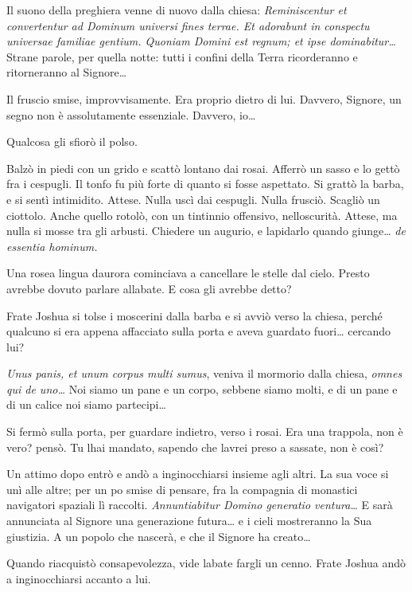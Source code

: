 Il suono della preghiera venne di nuovo dalla chiesa:
\emph{Reminiscentur et convertentur ad Dominum universi fines terrae. Et
	adorabunt in conspectu universae familiae gentium. Quoniam Domini est
	regnum; et ipse dominabitur\ldots{}} Strane parole, per quella notte:
tutti i confini della Terra ricorderanno e ritorneranno al
Signore\ldots{}

Il fruscio smise, improvvisamente. Era proprio dietro di lui. Davvero,
Signore, un segno non è assolutamente essenziale. Davvero, io\ldots{}

Qualcosa gli sfiorò il polso.

Balzò in piedi con un grido e scattò lontano dai rosai. Afferrò un sasso
e lo gettò fra i cespugli. Il tonfo fu più forte di quanto si fosse
aspettato. Si grattò la barba, e si sentì intimidito. Attese. Nulla uscì
dai cespugli. Nulla frusciò. Scagliò un ciottolo. Anche quello rotolò,
con un tintinnio offensivo, nell\textquotesingle oscurità. Attese, ma
nulla si mosse tra gli arbusti. Chiedere un augurio, e lapidarlo quando
giunge\ldots{} \emph{de essentia hominum.}

Una rosea lingua d\textquotesingle aurora cominciava a cancellare le
stelle dal cielo. Presto avrebbe dovuto parlare
all\textquotesingle abate. E cosa gli avrebbe detto?

Frate Joshua si tolse i moscerini dalla barba e si avviò verso la
chiesa, perché qualcuno si era appena affacciato sulla porta e aveva
guardato fuori\ldots{} cercando lui?

\emph{Unus panis, et unum corpus multi sumus}, veniva il mormorio dalla
chiesa, \emph{omnes qui de uno\ldots{}} Noi siamo un pane e un corpo,
sebbene siamo molti, e di un pane e di un calice noi siamo
partecipi\ldots{}

Si fermò sulla porta, per guardare indietro, verso i rosai. Era una
trappola, non è vero? pensò. Tu l\textquotesingle hai mandato, sapendo
che l\textquotesingle avrei preso a sassate, non è così?

Un attimo dopo entrò e andò a inginocchiarsi insieme agli altri. La sua
voce si unì alle altre; per un po\textquotesingle{} smise di pensare,
fra la compagnia di monastici navigatori spaziali lì raccolti.
\emph{Annuntiabitur Domino generatio ventura\ldots{}} E sarà annunciata
al Signore una generazione futura\ldots{} e i cieli mostreranno la Sua
giustizia. A un popolo che nascerà, e che il Signore ha creato\ldots{}

Quando riacquistò consapevolezza, vide l\textquotesingle abate fargli un
cenno. Frate Joshua andò a inginocchiarsi accanto a lui.

